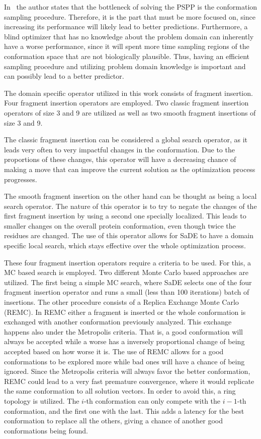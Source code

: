 In~\cite{kim2009sampling} the author states that the bottleneck of solving the
\ac{PSPP} is the conformation sampling procedure. Therefore, it is the part
that must be more focused on, since increasing its performance will likely lead
to better predictions. Furthermore, a blind optimizer that has no knowledge
about the problem domain can inherently have a worse performance, since it will
spent more time sampling regions of the conformation space that are not
biologically plausible. Thus, having an efficient sampling procedure and
utilizing problem domain knowledge is important and can possibly lead to a
better predictor.

The domain specific operator utilized in this work consists of
fragment insertion. Four fragment insertion operators are employed.
Two classic fragment insertion operators of size 3 and 9 are utilized
as well as two smooth fragment insertions of size 3 and 9.

The classic fragment insertion can be considered a global search
operator, as it leads very often to very impactful changes
in the conformation. Due to the proportions of these changes,
this operator will have a decreasing chance of making a move
that can improve the current solution as the optimization process
progresses.

The smooth fragment insertion on the other hand can be thought as
being a local search operator. The nature of this operator
is to try to negate the changes of the first fragment insertion by using
a second one specially localized. This leads to smaller changes on the
overall protein conformation, even though twice the residues are changed.
The use of this operator allows for \ac{SaDE} to have a domain specific local
search, which stays effective over the whole optimization process.

These four fragment insertion operators require a criteria to be used. For
this, a \ac{MC} based search is employed. Two different Monte Carlo based
approaches are utilized. The first being a simple \ac{MC} search, where
\ac{SaDE} selects one of the four fragment insertion operator and runs a small
(less than 100 iterations) batch of insertions. The other procedure consists of
a Replica Exchange Monte Carlo (REMC). In \ac{REMC} either a fragment is
inserted or the whole conformation is exchanged with another conformation
previously analyzed. This exchange happens also under the Metropolis criteria.
That is, a good conformation will always be accepted while a worse has a
inversely proportional change of being accepted based on how worse it is.  The
use of \ac{REMC} allows for a good conformations to be explored more while bad
ones will have a chance of being ignored. Since the Metropolis criteria will
always favor the better conformation, \ac{REMC} could lead to a very fast
premature convergence, where it would replicate the same conformation to all
solution vectors.  In order to avoid this, a ring topology is utilized. The
$i$-th conformation can only compete with the $i-1$-th conformation, and the
first one with the last. This adds a latency for the best conformation to
replace all the others, giving a chance of another good conformations being
found.

